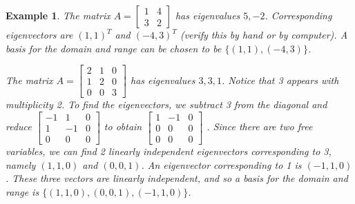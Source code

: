 \documentclass[10pt]{article}
\theoremstyle{plain}
\theoremstyle{box}
\newtheorem{example}{Example}
\begin{document}
\begin{example}
The matrix 
$A=
\begin{bmatrix}
 1 & 4 \\
 3 & 2
\end{bmatrix}
$ has eigenvalues $5,-2$.  Corresponding eigenvectors are $(1,1)^T$ and $(-4,3)^T$ (verify this by hand or by computer). A basis for the domain and range can be chosen to be $\{(1,1),(-4,3)\}$.

The matrix 
$A=
\begin{bmatrix}
 2 & 1 & 0 \\
 1 & 2 & 0 \\
 0 & 0 & 3
\end{bmatrix}
$ has eigenvalues $3,3,1$. Notice that 3 appears with multiplicity 2.  To find the eigenvectors, we subtract 3 from the diagonal and reduce 
$
\begin{bmatrix}
 -1 & 1 & 0 \\
 1 & -1 & 0 \\
 0 & 0 & 0
\end{bmatrix}
$
to obtain
$
\begin{bmatrix}
 1 & -1 & 0 \\
 0 & 0 & 0 \\
 0 & 0 & 0
\end{bmatrix}
$
. Since there are two free variables, we can find 2 linearly independent eigenvectors corresponding to 3, namely $(1,1,0)$ and $(0,0,1)$. An eigenvector corresponding to 1 is $(-1,1,0)$. These three vectors are linearly independent, and so a basis for the domain and range is $\{ (1,1,0), (0,0,1), (-1,1,0) \}$.    


\end{example}
\end{document}
